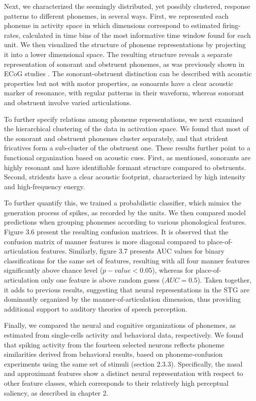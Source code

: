 Next, we characterized the seemingly distributed, yet possibly clustered, response patterns to different phonemes, in several ways. First, we represented each phoneme in activity space in which dimensions correspond to estimated firing-rates, calculated in time bins of the most informative time window found for each unit. We then visualized the structure of phoneme representations by projecting it into a lower dimensional space. The resulting structure reveals a separate representation of sonorant and obstruent phonemes, as was previously shown in ECoG studies \citep{Mesgarani2014}. The sonorant-obstruent distinction can be described with acoustic properties but not with motor properties, as sonoarnts have a clear acoustic marker of resonance, with regular patterns in their waveform, whereas sonorant and obstruent involve varied articulations.

To further specify relations among phoneme representations, we next examined the hierarchical clustering of the data in activation space. We found that most of the sonorant and obstruent phonemes cluster separately, and that strident fricatives form a sub-cluster of the obstruent one. These results further point to a functional organization based on acoustic cues. First, as mentioned, sonorants are highly resonant and have identifiable formant structure compared to obstruents. Second, stridents have a clear acoustic footprint, characterized by high intensity and high-frequency energy. 

To further quantify this, we trained a probabilistic classifier, which mimics the generation process of spikes, as recorded by the units. We then compared model predictions when grouping phonemes according to various phonological features. Figure 3.6 present the resulting confusion matrices. It is observed that the confusion matrix of manner features is more diagonal compared to place-of-articulation features. Similarly, figure 3.7 presents AUC values for binary classifications for the same set of features, resulting with all four manner features significantly above chance level ($p-value<0.05$), whereas for place-of-articulation only one feature is above random guess ($AUC = 0.5$). Taken together, it adds to previous results, suggesting that neural representations in the STG are dominantly organized by the manner-of-articulation dimension, thus providing additional support to auditory theories of speech perception. 

Finally, we compared the neural and cognitive organizations of phonemes, as estimated from single-cells activity and behavioral data, respectively. We found that spiking activity from the fourteen selected neurons reflects phoneme similarities derived from behavioral results, based on phoneme-confusion experiments using the same set of stimuli (section 2.3.3). Specifically, the nasal and approximant features show a distinct neural representation with respect to other feature classes, which corresponds to their relatively high perceptual saliency, as described in chapter 2.


